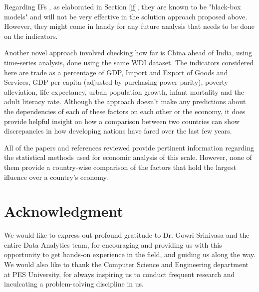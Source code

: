 \documentclass[conference]{IEEEtran}
\begin{document}
Regarding IFs \cite{ifmodel}, as elaborated in Section \ref{if}, they are known to be "black-box models" and will not be very effective in the solution approach proposed above. However, they might come in handy for any future analysis that needs to be done on the indicators.

Another novel approach\cite{indchin} involved checking how far is China ahead of India, using time-series analysis, done using the same WDI dataset. The indicators considered here are trade as a percentage of GDP, Import and Export of Goods and Services, GDP per capita (adjusted by purchasing power parity), poverty alleviation, life expectancy, urban population growth, infant mortality and the adult literacy rate. Although the approach doesn't make any predictions about the dependencies of each of these factors on each other or the economy, it does provide helpful insight on how a comparison between two countries can show discrepancies in how developing nations have fared over the last few years. 

All of the papers and references reviewed provide pertinent information regarding the statistical methods used for economic analysis of this scale. However, none of them provide a country-wise comparison of the factors that hold the largest ifluence over a country's economy.


\section*{Acknowledgment}

We would like to express out profound gratitude to Dr. Gowri Srinivasa and the entire Data Analytics team, for encouraging and providing us with this opportunity to get hands-on experience in the field, and guiding us along the way. We would also like to thank the Computer Science and Engineering department at PES University, for always inspiring us to conduct frequent research and inculcating a problem-solving discipline in us.

\printbibliography
\end{document}
